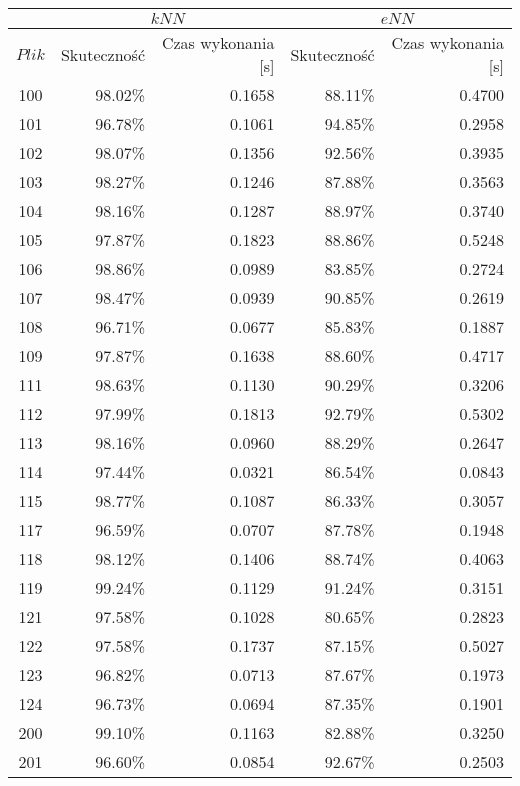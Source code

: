 \begin{table}[H]
	\centering
	\begin{tabular}{|c|r|r|r|r|}
		\hline
		& \multicolumn{2}{c|}{$kNN$} & \multicolumn{2}{c|}{$eNN$} \\
		\hline
		$Plik$ & Skuteczność & Czas wykonania [s] & Skuteczność & Czas wykonania [s] \\
		\hline
100 &  98.02\% & 0.1658 &  88.11\% & 0.4700 \\ 
\hline
101 &  96.78\% & 0.1061 &  94.85\% & 0.2958 \\ 
\hline
102 &  98.07\% & 0.1356 &  92.56\% & 0.3935 \\ 
\hline
103 &  98.27\% & 0.1246 &  87.88\% & 0.3563 \\ 
\hline
104 &  98.16\% & 0.1287 &  88.97\% & 0.3740 \\ 
\hline
105 &  97.87\% & 0.1823 &  88.86\% & 0.5248 \\ 
\hline
106 &  98.86\% & 0.0989 &  83.85\% & 0.2724 \\ 
\hline
107 &  98.47\% & 0.0939 &  90.85\% & 0.2619 \\ 
\hline
108 &  96.71\% & 0.0677 &  85.83\% & 0.1887 \\ 
\hline
109 &  97.87\% & 0.1638 &  88.60\% & 0.4717 \\ 
\hline
111 &  98.63\% & 0.1130 &  90.29\% & 0.3206 \\ 
\hline
112 &  97.99\% & 0.1813 &  92.79\% & 0.5302 \\ 
\hline
113 &  98.16\% & 0.0960 &  88.29\% & 0.2647 \\ 
\hline
114 &  97.44\% & 0.0321 &  86.54\% & 0.0843 \\ 
\hline
115 &  98.77\% & 0.1087 &  86.33\% & 0.3057 \\ 
\hline
117 &  96.59\% & 0.0707 &  87.78\% & 0.1948 \\ 
\hline
118 &  98.12\% & 0.1406 &  88.74\% & 0.4063 \\ 
\hline
119 &  99.24\% & 0.1129 &  91.24\% & 0.3151 \\ 
\hline
121 &  97.58\% & 0.1028 &  80.65\% & 0.2823 \\ 
\hline
122 &  97.58\% & 0.1737 &  87.15\% & 0.5027 \\ 
\hline
123 &  96.82\% & 0.0713 &  87.67\% & 0.1973 \\ 
\hline
124 &  96.73\% & 0.0694 &  87.35\% & 0.1901 \\ 
\hline
200 &  99.10\% & 0.1163 &  82.88\% & 0.3250 \\ 
\hline
201 &  96.60\% & 0.0854 &  92.67\% & 0.2503 \\ 

\end{tabular}
\end{table}
